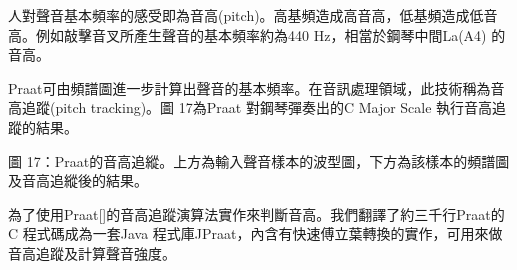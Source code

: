 \documentclass[12pt,a4paper,oneside]{report}
\begin{document}
人對聲音基本頻率的感受即為音高(pitch)。高基頻造成高音高，低基頻造成低音高。例如敲擊音叉所產生聲音的基本頻率約為440 Hz，相當於鋼琴中間La(A4) 的音高。

Praat可由頻譜圖進一步計算出聲音的基本頻率。在音訊處理領域，此技術稱為音高追蹤(pitch tracking)。圖 17為Praat 對鋼琴彈奏出的C Major Scale 執行音高追蹤的結果。


圖 17：Praat的音高追縱。上方為輸入聲音樣本的波型圖，下方為該樣本的頻譜圖及音高追縱後的結果。

為了使用Praat[]的音高追蹤演算法實作來判斷音高。我們翻譯了約三千行Praat的C 程式碼成為一套Java 程式庫JPraat，內含有快速傅立葉轉換的實作，可用來做音高追蹤及計算聲音強度。
\end{document}
